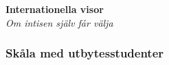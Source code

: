 \begin{center}
    \vspace*{1.5cm}
    {\fontsize{20}{20}\textbf{Internationella visor}}\\
    \vspace{0.7cm}
    {\fontsize{12}{12}\textit{Om intisen själv får välja}}
\end{center}
\noBackground

\newpage
\resetBackground

\subsubsection*{Skåla med utbytesstudenter}

\renewcommand{\arraystretch}{1.2}

